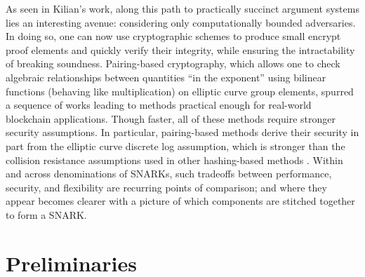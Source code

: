 \noindent As seen in Kilian's work, along this path to practically succinct argument systems lies an interesting avenue: considering only computationally bounded adversaries. In doing so, one can now use cryptographic schemes to produce small encrypt proof elements and quickly verify their integrity, while ensuring the intractability of breaking soundness. Pairing-based cryptography, which allows one to check algebraic relationships between quantities ``in the exponent'' using bilinear functions (behaving like multiplication) on elliptic curve group elements, spurred a sequence of works leading to methods practical enough for real-world blockchain applications. Though faster, all of these methods require stronger security assumptions. In particular, pairing-based methods derive their security in part from the elliptic curve discrete log assumption, which is stronger than the collision resistance assumptions used in other hashing-based methods \cite{starks, ligero, hyrax, aurora}. Within and across denominations of SNARKs, such tradeoffs between performance, security, and flexibility are recurring points of comparison; and where they appear becomes clearer with a picture of which components are stitched together to form a SNARK.


\section{Preliminaries}

